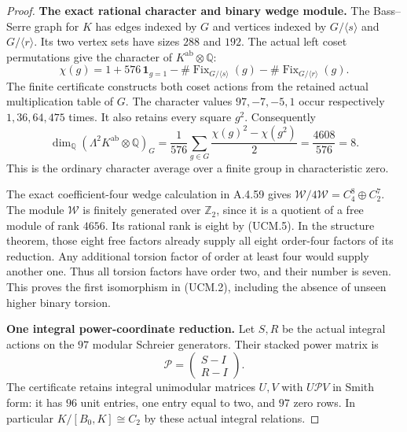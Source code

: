 \begin{proof}
\par\medskip\noindent\textbf{The exact rational character and binary wedge module.}\quad
The Bass--Serre graph for $K$ has edges indexed by $G$ and
vertices indexed by $G/\langle s\rangle$ and
$G/\langle r\rangle$. Its two vertex sets have sizes $288$
and $192$. The actual left coset permutations give the
character of $K^{\mathrm{ab}}\otimes\mathbb Q$:
\[
 \chi(g)=1+576\,\mathbf1_{g=1}
          -\#\operatorname{Fix}_{G/\langle s\rangle}(g)
          -\#\operatorname{Fix}_{G/\langle r\rangle}(g).
                                                        \tag{UCM.4}
\]
The finite certificate constructs both coset actions from
the retained actual multiplication table of $G$.
The character values $97,-7,-5,1$ occur respectively
$1,36,64,475$ times. It also retains every square $g^2$.
Consequently
\[
 \dim_{\mathbb Q}(\Lambda^2 K^{\mathrm{ab}}\otimes\mathbb Q)_G
   =\frac1{576}\sum_{g\in G}
                  \frac{\chi(g)^2-\chi(g^2)}2
   =\frac{4608}{576}=8.
                                                        \tag{UCM.5}
\]
This is the ordinary character average over a finite group
in characteristic zero.

The exact coefficient-four wedge calculation in A.4.59
gives
$\mathcal W/4\mathcal W=C_4^8\oplus C_2^7$.
The module $\mathcal W$ is finitely generated over
$\mathbb Z_2$, since it is a quotient of a free module
of rank $4656$. Its rational rank is eight by (UCM.5).
In the structure theorem, those eight free factors already
supply all eight order-four factors of its reduction.
Any additional torsion factor of order at least four
would supply another one. Thus all torsion factors have
order two, and their number is seven. This proves the
first isomorphism in (UCM.2), including the absence of
unseen higher binary torsion.

\par\medskip\noindent\textbf{One integral power-coordinate reduction.}\quad
Let $S,R$ be the actual integral actions on the $97$
modular Schreier generators. Their stacked power matrix is
\[
             \mathcal P=\begin{pmatrix}S-I\\R-I\end{pmatrix}.
                                                        \tag{UCM.6}
\]
The certificate retains integral unimodular matrices
$U,V$ with $U\mathcal P V$ in Smith form: it has $96$
unit entries, one entry equal to two, and $97$ zero rows.
In particular $K/[B_0,K]\cong C_2$ by these actual
integral relations.


\end{proof}

